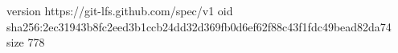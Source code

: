 version https://git-lfs.github.com/spec/v1
oid sha256:2ec31943b8fc2eed3b1ccb24dd32d369fb0d6ef62f88c43f1fdc49bead82da74
size 778
